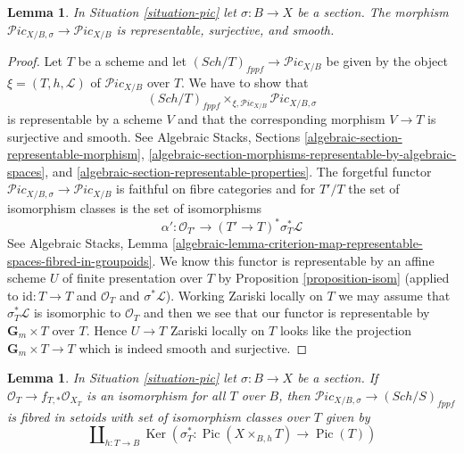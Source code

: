 \documentclass{stacks-project}
\theoremstyle{plain}
\newtheorem{lemma}[subsection]{Lemma}
\theoremstyle{definition}
\theoremstyle{remark}
\numberwithin{equation}{subsection}
\def\Sch{\mathit{Sch}}
\def\Ker{\mathop{\mathrm{Ker}}}
\def\Pic{\mathop{\mathrm{Pic}}\nolimits}
\def\Picardstack{\mathcal{P}\!\mathit{ic}}
\begin{document}
\begin{lemma}
\label{lemma-compare-pic-with-section}
In Situation \ref{situation-pic} let $\sigma : B \to X$ be a section.
The morphism $\Picardstack_{X/B, \sigma} \to \Picardstack_{X/B}$
is representable, surjective, and smooth.
\end{lemma}

\begin{proof}
Let $T$ be a scheme and let $(\Sch/T)_{fppf} \to \Picardstack_{X/B}$
be given by the object $\xi = (T, h, \mathcal{L})$ of $\Picardstack_{X/B}$
over $T$. We have to show that
$$
(\Sch/T)_{fppf} \times_{\xi, \Picardstack_{X/B}} \Picardstack_{X/B, \sigma}
$$
is representable by a scheme $V$ and that the corresponding morphism
$V \to T$ is surjective and smooth. See
Algebraic Stacks, Sections \ref{algebraic-section-representable-morphism},
\ref{algebraic-section-morphisms-representable-by-algebraic-spaces}, and
\ref{algebraic-section-representable-properties}.
The forgetful functor $\Picardstack_{X/B, \sigma} \to \Picardstack_{X/B}$
is faithful on fibre categories and for $T'/T$ the set of isomorphism
classes is the set of isomorphisms
$$
\alpha' : \mathcal{O}_{T'} \longrightarrow (T' \to T)^*\sigma_T^*\mathcal{L}
$$
See Algebraic Stacks, Lemma
\ref{algebraic-lemma-criterion-map-representable-spaces-fibred-in-groupoids}.
We know this functor is representable by an affine scheme $U$ of finite
presentation over $T$ by Proposition \ref{proposition-isom}
(applied to $\text{id} : T \to T$ and $\mathcal{O}_T$ and
$\sigma^*\mathcal{L}$). Working Zariski locally on $T$ we may
assume that $\sigma_T^*\mathcal{L}$ is isomorphic to $\mathcal{O}_T$
and then we see that our functor is representable by
$\mathbf{G}_m \times T$ over $T$. Hence
$U \to T$ Zariski locally on $T$ looks like 
the projection $\mathbf{G}_m \times T \to T$ which
is indeed smooth and surjective.
\end{proof}

\begin{lemma}
\label{lemma-flat-geometrically-connected-fibres-with-section-functor-stack}
In Situation \ref{situation-pic} let $\sigma : B \to X$ be a section.
If $\mathcal{O}_T \to f_{T, *}\mathcal{O}_{X_T}$ is an isomorphism
for all $T$ over $B$, then
$\Picardstack_{X/B, \sigma} \to (\Sch/S)_{fppf}$
is fibred in setoids with set of isomorphism classes over $T$ given by
$$
\coprod\nolimits_{h : T \to B}
\Ker(\sigma_T^* : \Pic(X \times_{B, h} T) \to \Pic(T))
$$
\end{lemma}
\end{document}
